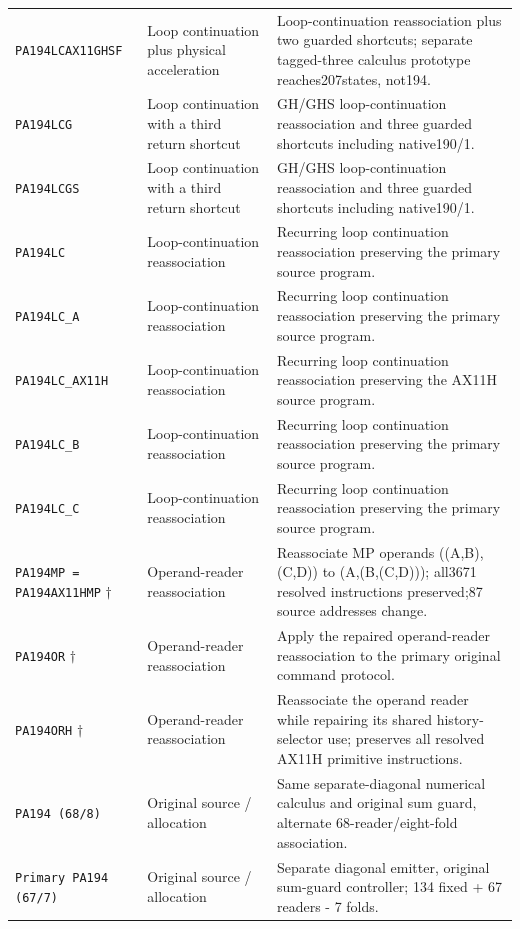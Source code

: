 \begin{longtable}{@{}>{\raggedright\arraybackslash}p{}>{\raggedright\arraybackslash}p{}>{\raggedright\arraybackslash}p{}@{}}
\nolinkurl{PA194LCAX11GHSF} & Loop continuation plus physical acceleration & Loop-continuation reassociation plus two guarded shortcuts; separate tagged-three calculus prototype reaches207states, not194.\\
\nolinkurl{PA194LCG} & Loop continuation with a third return shortcut & GH/GHS loop-continuation reassociation and three guarded shortcuts including native190/1.\\
\nolinkurl{PA194LCGS} & Loop continuation with a third return shortcut & GH/GHS loop-continuation reassociation and three guarded shortcuts including native190/1.\\
\nolinkurl{PA194LC} & Loop-continuation reassociation & Recurring loop continuation reassociation preserving the primary source program.\\
\nolinkurl{PA194LC_A} & Loop-continuation reassociation & Recurring loop continuation reassociation preserving the primary source program.\\
\nolinkurl{PA194LC_AX11H} & Loop-continuation reassociation & Recurring loop continuation reassociation preserving the AX11H source program.\\
\nolinkurl{PA194LC_B} & Loop-continuation reassociation & Recurring loop continuation reassociation preserving the primary source program.\\
\nolinkurl{PA194LC_C} & Loop-continuation reassociation & Recurring loop continuation reassociation preserving the primary source program.\\
\nolinkurl{PA194MP = PA194AX11HMP} $\dagger$ & Operand-reader reassociation & Reassociate MP operands ((A,B),(C,D)) to (A,(B,(C,D))); all3671 resolved instructions preserved;87 source addresses change.\\
\nolinkurl{PA194OR} $\dagger$ & Operand-reader reassociation & Apply the repaired operand-reader reassociation to the primary original command protocol.\\
\nolinkurl{PA194ORH} $\dagger$ & Operand-reader reassociation & Reassociate the operand reader while repairing its shared history-selector use; preserves all resolved AX11H primitive instructions.\\
\nolinkurl{PA194 (68/8)} & Original source / allocation & Same separate-diagonal numerical calculus and original sum guard, alternate 68-reader/eight-fold association.\\
\nolinkurl{Primary PA194 (67/7)} & Original source / allocation & Separate diagonal emitter, original sum-guard controller; 134 fixed + 67 readers - 7 folds.\\

\end{longtable}
